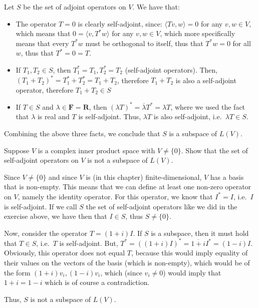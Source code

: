\begin{solution}
    Let $S$ be the set of adjoint operators on $V$. We have that:
    \begin{itemize}
        \item The operator $T = 0$ is clearly self-adjoint, since: $\langle Tv, w \rangle = 0$ for any $v, w \in V$, which means that $0 = \langle v, T^*w \rangle$ for any $v, w \in V$, which more specifically means that every $T^* w$ must be orthogonal to itself, thus that $T^* w = 0$ for all $w$, thus that $T^* = 0 = T$.
        \item If $T_1, T_2 \in S$, then $T_1^* = T_1, T_2^* = T_2$ (self-adjoint operators). Then, $(T_1 + T_2)^* = T_1^* + T_2^* = T_1 + T_2$, therefore $T_1 + T_2$ is also a self-adjoint operator, therefore $T_1 + T_2 \in S$
        \item If $T \in S$ and $\lambda \in \mathbf{F} = \mathbf{R}$, then $(\lambda T)^* = \overline{\lambda} T^* = \lambda T$, where we used the fact that $\lambda$ is real and $T$ is self-adjoint. Thus, $\lambda T$ is also self-adjoint, i.e.\ $\lambda T \in S$.
    \end{itemize}
    Combining the above three facts, we conclude that $S$ is a subspace of $L(V)$.
\end{solution}

\begin{exercise}{9}
    Suppose $V$ is a complex inner product space with $V \neq \{0\}$. Show that the set of self-adjoint operators on $V$ is not a subspace of $L(V)$.
\end{exercise}

\begin{solution}

    Since $V \neq \{0\}$ and since $V$ is (in this chapter) finite-dimensional, $V$ has a basis that is non-empty. This means that we can define at least one non-zero operator on $V$, namely the identity operator. For this operator, we know that $I^* = I$, i.e.\ $I$ is self-adjoint. If we call $S$ the set of self-adjoint operators like we did in the exercise above, we have then that $I \in S$, thus $S \neq \{0\}$.

    Now, consider the operator $T = (1 + i)I$. If $S$ is a subspace, then it must hold that $T \in S$, i.e.\ $T$ is self-adjoint. But, $T^* = ((1 + i)I)^* = \overline{1 + i}I^* = (1 - i) I$. Obviously, this operator does not equal $T$, because this would imply equality of their values on the vectors of the basis (which is non-empty), which would be of the form $(1 + i)v_i, (1 - i)v_i$, which (since $v_i \neq 0$) would imply that $1 + i = 1 - i$ which is of course a contradiction.

    Thus, $S$ is not a subspace of $L(V)$.
\end{solution}

